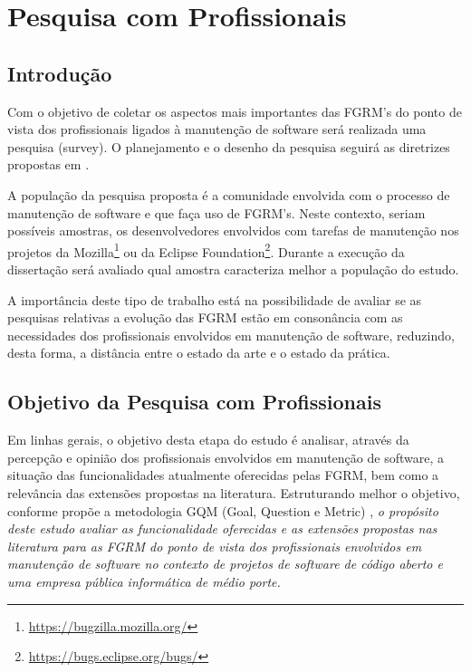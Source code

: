 \chapter{Pesquisa com Profissionais}
\label{ch:pesquisa-profissionais}

\section{Introdução}
\label{sec:pesquisa-profissionais-intro}


Com o objetivo de coletar os aspectos mais importantes das FGRM's do ponto de
vista dos profissionais ligados à manutenção de software será realizada uma
 pesquisa (survey). O planejamento e o desenho da pesquisa seguirá as diretrizes propostas em \cite{wohlin2012experimentation}.

A população da pesquisa proposta é a comunidade envolvida com o processo de
manutenção de software e que faça uso de FGRM's. Neste contexto, seriam
possíveis amostras, os desenvolvedores envolvidos com tarefas de manutenção nos
projetos da Mozilla\footnote{\url{https://bugzilla.mozilla.org/}} ou da
Eclipse Foundation\footnote{\url{https://bugs.eclipse.org/bugs/}}. Durante a
execução da dissertação será avaliado qual amostra caracteriza melhor a
população do estudo.

A importância deste tipo de trabalho está na possibilidade de avaliar se as pesquisas relativas a
evolução das FGRM estão em consonância com as necessidades dos profissionais envolvidos em
manutenção de software, reduzindo, desta forma, a distância entre o estado da arte e o estado da
prática.
\section{Objetivo da Pesquisa com Profissionais}
\label{sec:objetivo_da_pesquisa_com_profissionais}

Em linhas gerais, o objetivo desta etapa do estudo é analisar, através da percepção e opinião dos
profissionais envolvidos em manutenção de software, a situação das funcionalidades atualmente
oferecidas pelas FGRM, bem como a relevância das extensões propostas na literatura. Estruturando
melhor o objetivo, conforme propõe a metodologia GQM (Goal, Question e Metric) \cite{van2002goal},
\textit{o propósito deste estudo avaliar as funcionalidade oferecidas e as extensões propostas nas literatura para as FGRM do ponto de vista dos profissionais envolvidos em manutenção de software no contexto de projetos de software de código aberto e uma empresa pública informática de médio porte.}  

